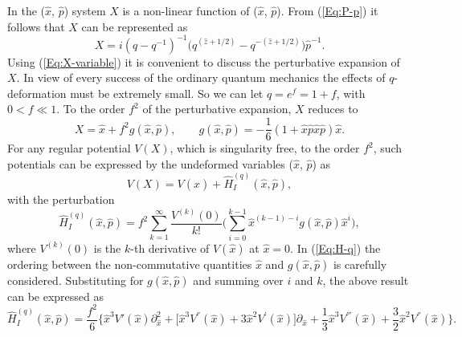 \documentclass[a4paper,12pt]{article}
\begin{document}
In the  ($\hat x$, $\hat p$) system  $X$ is a non-linear function of
 ($\hat x$, $\hat p$).
From (\ref{Eq:P-p}) it follows that $X$ can be represented as
\begin{equation}
\label{Eq:X-variable}
X=i(q-q^{-1})^{-1} \bigl( q^{(\hat z+1/2)} -
q^{-(\hat z+1/2)}\bigr)\hat p^{-1}. 
\end{equation}
Using (\ref{Eq:X-variable}) it is convenient to discuss the perturbative 
expansion of $X$.
In view of every success of the ordinary quantum mechanics the effects of
$q$-deformation must be extremely small. So we can  let $q=e^{f}=1+f$, 
with $0<f\ll1$. To the order $f^2$ of the perturbative expansion,  $X$ 
reduces to 
\begin{equation}
\label{Eq:X-perturbative}
X=\hat x  + f^2 g(\hat x, \hat p), \qquad
g(\hat x,\hat p)=-\frac{1}{6}(1+
\hat x  \hat p  \hat x  \hat p )\hat x.
\end{equation} 
For any regular potential $V(X)$, which is singularity free, to the 
order $f^2$,  such potentials can be expressed by the 
undeformed variables ($\hat x$, $\hat p$) as
\begin{equation}
\label{Eq:q-potential}
V(X)=V(\hat x) +\hat H^{(q)}_I(\hat x,\hat p),
\end{equation}
with the perturbation
\begin{equation}
\label{Eq:H-q}
\hat H^{(q)}_I(\hat x,\hat p)=f^2\sum_{k=1}^\infty \frac{V^{(k)}(0)}{k!}
\biggl( \sum_{i=0}^{k-1}\hat x^{(k-1)-i}g(\hat x,\hat p)\hat x^{i}\biggr), 
\end{equation}
where $V^{(k)}(0)$ is the $k$-th derivative of $V(\hat x)$ at $\hat x=0.$ 
In (\ref{Eq:H-q}) the ordering between the non-commutative quantities
$ \hat x$ and $g(\hat x,\hat p)$  is  carefully considered. 
Substituting for $g(\hat x,\hat p)$ and summing over $i$ and $k$,
the above result can be expressed as
\begin{equation}
\label{Eq:H-q-summed}
\hat H^{(q)}_I(\hat x,\hat p)
=\frac{f^2}{6}
\bigl\{ \hat x^3 V'(\hat x) \partial^2_{\hat x} 
+ \bigl[\hat x^3 V^{''}(\hat x) +3 \hat x^2 V^{'}(\hat x)\bigr]\partial_{\hat x}
+{\textstyle\frac{1}{3}}\hat x^3 V^{'''}(\hat x) 
+{\textstyle\frac{3}{2}}\hat x^2 V^{''}(\hat x)\bigr\}.
\end{equation}
\end{document}
